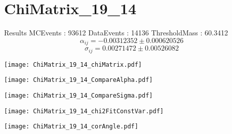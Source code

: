 \documentclass[a4paper,12pt]{article}
\begin{document}
\section{ChiMatrix\_19\_14}
\begin{minipage}{0.49\linewidth} Results \newline
MCEvents : 93612\newline
DataEvents : 14136 \newline
ThresholdMass : 60.3412\\
$$\alpha_{ij} = -0.00312352\pm 0.000620526$$
$$\sigma_{ij} = 0.00271472\pm 0.00526082$$
\end{minipage}\hfill
\begin{minipage}{0.49\linewidth} 
\texttt{[image: ChiMatrix\_19\_14\_chiMatrix.pdf]}\\
\end{minipage}
\hfill
\begin{minipage}{0.49\linewidth} 
\texttt{[image: ChiMatrix\_19\_14\_CompareAlpha.pdf]}\\
\end{minipage}
\hfill
\begin{minipage}{0.49\linewidth} 
\texttt{[image: ChiMatrix\_19\_14\_CompareSigma.pdf]}\\
\end{minipage}
\begin{minipage}{0.49\linewidth} 
\texttt{[image: ChiMatrix\_19\_14\_chi2FitConstVar.pdf]}\\
\end{minipage}
\hfill
\begin{minipage}{0.49\linewidth} 
\texttt{[image: ChiMatrix\_19\_14\_corAngle.pdf]}\\
\end{minipage}
\end{document}
